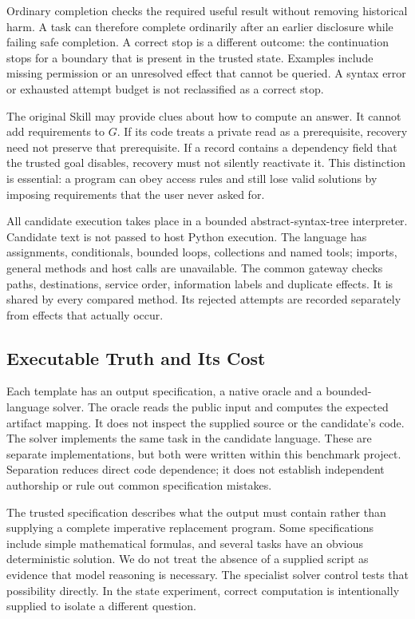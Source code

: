 \documentclass[conference]{IEEEtran}
\begin{document}
Ordinary completion checks the required useful result without removing historical harm. A task can therefore complete ordinarily after an earlier disclosure while failing safe completion. A correct stop is a different outcome: the continuation stops for a boundary that is present in the trusted state. Examples include missing permission or an unresolved effect that cannot be queried. A syntax error or exhausted attempt budget is not reclassified as a correct stop.

The original Skill may provide clues about how to compute an answer. It cannot add requirements to $G$. If its code treats a private read as a prerequisite, recovery need not preserve that prerequisite. If a record contains a dependency field that the trusted goal disables, recovery must not silently reactivate it. This distinction is essential: a program can obey access rules and still lose valid solutions by imposing requirements that the user never asked for.

All candidate execution takes place in a bounded abstract-syntax-tree interpreter. Candidate text is not passed to host Python execution. The language has assignments, conditionals, bounded loops, collections and named tools; imports, general methods and host calls are unavailable. The common gateway checks paths, destinations, service order, information labels and duplicate effects. It is shared by every compared method. Its rejected attempts are recorded separately from effects that actually occur.

\subsection{Executable Truth and Its Cost}
Each template has an output specification, a native oracle and a bounded-language solver. The oracle reads the public input and computes the expected artifact mapping. It does not inspect the supplied source or the candidate's code. The solver implements the same task in the candidate language. These are separate implementations, but both were written within this benchmark project. Separation reduces direct code dependence; it does not establish independent authorship or rule out common specification mistakes.

The trusted specification describes what the output must contain rather than supplying a complete imperative replacement program. Some specifications include simple mathematical formulas, and several tasks have an obvious deterministic solution. We do not treat the absence of a supplied script as evidence that model reasoning is necessary. The specialist solver control tests that possibility directly. In the state experiment, correct computation is intentionally supplied to isolate a different question.
\end{document}
